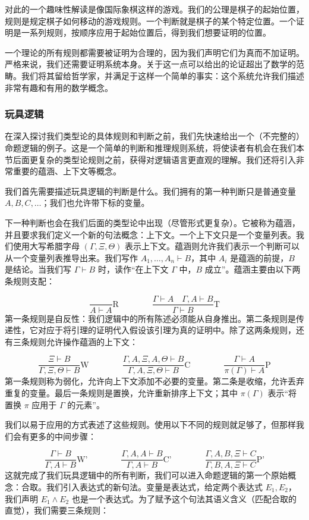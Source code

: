 \documentclass{ctexrep}
\theoremstyle{plain}
\theoremstyle{definition}
\theoremstyle{remark}
\theoremstyle{definition}
\theoremstyle{definition}
\theoremstyle{definition}
\begin{document}
对此的一个趣味性解读是像国际象棋这样的游戏。我们的公理是棋子的起始位置，规则是规定棋子如何移动的游戏规则。一个判断就是棋子的某个特定位置。一个证明是一系列规则，按顺序应用于起始位置后，得到我们想要证明的位置。

一个理论的所有规则都需要被证明为合理的，因为我们声明它们为真而不加证明。严格来说，我们还需要证明系统本身。关于这一点可以给出的论证超出了数学的范畴。我们将其留给哲学家，并满足于这样一个简单的事实：这个系统允许我们描述非常有趣和有用的数学概念。

\subsubsection{玩具逻辑}

在深入探讨我们类型论的具体规则和判断之前，我们先快速给出一个（不完整的）命题逻辑的例子。这是一个简单的判断和推理规则系统，将使读者有机会在我们本节后面更复杂的类型论规则之前，获得对逻辑语言更直观的理解。我们还将引入非常重要的蕴涵、上下文等概念。

我们首先需要描述玩具逻辑的判断是什么。我们拥有的第一种判断只是普通变量 $A,B,C,\ldots$；我们也允许带下标的变量。

下一种判断也会在我们后面的类型论中出现（尽管形式更复杂）。它被称为蕴涵，并且要求我们定义一个新的句法概念：上下文。一个上下文只是一个变量列表。我们使用大写希腊字母 $(\Gamma ,\Xi ,\Theta)$ 表示上下文。蕴涵则允许我们表示一个判断可以从一个变量列表推导出来。我们写作 $A_{1},\ldots ,A_{n}\vdash B$，其中 $A_i$ 是蕴涵的前提，$B$ 是结论。当我们写 $\Gamma \vdash B$ 时，读作“在上下文 $\Gamma$ 中，$B$ 成立”。蕴涵主要由以下两条规则支配：

\[
\frac{}{A\vdash A} \text{R} \qquad\qquad \frac{\Gamma\vdash A \quad \Gamma,A\vdash B}{\Gamma\vdash B} \text{T}
\]
第一条规则是自反性：我们逻辑中的所有陈述必须能从自身推出。第二条规则是传递性，它对应于将引理的证明代入假设该引理为真的证明中。除了这两条规则，还有三条规则允许操作蕴涵的上下文：

\[
\frac{\Xi\vdash B}{\Gamma,\Xi,\Theta\vdash B} \text{W} \qquad\qquad \frac{\Gamma,A,\Xi,A,\Theta\vdash B}{\Gamma,A,\Xi,\Theta\vdash B} \text{C} \qquad\qquad \frac{\Gamma\vdash A}{\pi(\Gamma)\vdash A} \text{P}
\]
第一条规则称为弱化，允许向上下文添加不必要的变量。第二条是收缩，允许丢弃重复的变量。最后一条规则是置换，允许重新排序上下文；其中 $\pi(\Gamma)$ 表示“将置换 $\pi$ 应用于 $\Gamma$ 的元素”。

我们以易于应用的方式表述了这些规则。使用以下不同的规则就足够了，但那样我们会有更多的中间步骤：

\[
\frac{\Gamma\vdash B}{\Gamma,A\vdash B} \text{W'} \qquad\qquad \frac{\Gamma,A,A\vdash B}{\Gamma,A\vdash B} \text{C'} \qquad\qquad \frac{\Gamma,A,B,\Xi\vdash C}{\Gamma,B,A,\Xi\vdash C} \text{P'}
\]
这就完成了我们玩具逻辑中的所有判断，我们可以进入命题逻辑的第一个原始概念：合取。我们引入表达式的新句法。变量是表达式，给定两个表达式 $E_{1},E_{2}$，我们声明 $E_{1}\wedge E_{2}$ 也是一个表达式。为了赋予这个句法其语义含义（匹配合取的直觉），我们需要三条规则：
\end{document}
